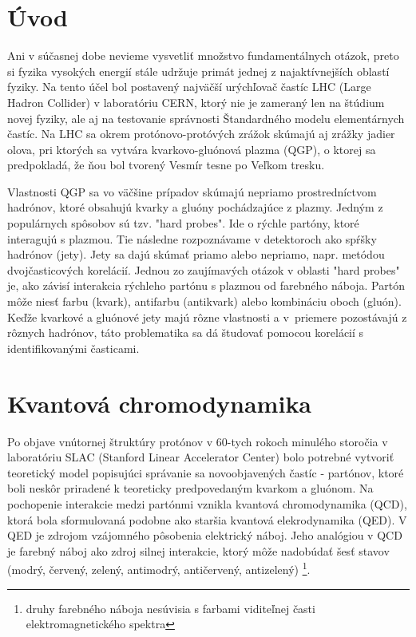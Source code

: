 \documentclass[thesismargins, thesislinespacing]{rnthesis}
\begin{document}
\chapter*{Úvod}

Ani v súčasnej dobe nevieme vysvetliť množstvo fundamentálnych otázok, preto si fyzika vysokých energií stále udržuje primát jednej z najaktívnejších oblastí fyziky. Na tento účel bol postavený najväčší urýchľovač častíc LHC (Large Hadron Collider) v laboratóriu CERN, ktorý nie je zameraný len na štúdium novej fyziky, ale aj na testovanie správnosti Štandardného modelu elementárnych častíc. Na LHC sa okrem protónovo-protóvých zrážok skúmajú aj zrážky jadier olova, pri ktorých  sa vytvára kvarkovo-gluónová plazma (QGP), o ktorej sa predpokladá, že ňou bol tvorený Vesmír tesne po Veľkom tresku. 

Vlastnosti QGP sa vo väčšine prípadov skúmajú nepriamo prostredníctvom \-had\-ró\-nov, ktoré obsahujú kvarky a gluóny pochádzajúce z plazmy. Jedným z populárnych \-spô\-so\-bov sú tzv. "hard probes". Ide o rýchle partóny, ktoré interagujú s plazmou. Tie následne rozpoznávame v detektoroch ako spŕšky hadrónov (jety). Jety sa dajú skúmať \-pria\-mo alebo nepriamo, napr. metódou dvojčasticových korelácií. Jednou zo zaujímavých otázok v oblasti "hard probes" \-je, ako závisí interakcia rýchleho partónu s plazmou od farebného náboja. Partón môže niesť farbu (kvark), antifarbu (antikvark) alebo kombináciu oboch (gluón). Keďže kvarkové a gluónové jety majú rôzne vlastnosti a v~priemere pozostávajú z rôznych hadrónov, táto problematika sa dá študovať pomocou korelácií s identifikovanými časticami.  



\chapter{Kvantová chromodynamika}

Po objave vnútornej štruktúry protónov v 60-tych rokoch minulého storočia v laboratóriu SLAC (Stanford Linear Accelerator Center) bolo potrebné vytvoriť teoretický model popisujúci správanie sa novoobjavených častíc - partónov, ktoré boli neskôr priradené k teoreticky predpovedaným kvarkom a gluónom. Na pochopenie interakcie medzi partónmi vznikla kvantová chromodynamika (QCD), ktorá bola sformulovaná podobne ako staršia kvantová elekrodynamika (QED). V QED je zdrojom vzájomného pôsobenia elektrický náboj. Jeho analógiou v QCD je farebný náboj ako zdroj silnej interakcie, ktorý môže nadobúdať šesť stavov (modrý, červený, zelený, antimodrý, antičervený, antizelený) \footnote{druhy farebného náboja nesúvisia s farbami viditeľnej časti elektromagnetického spektra}.
\end{document}
